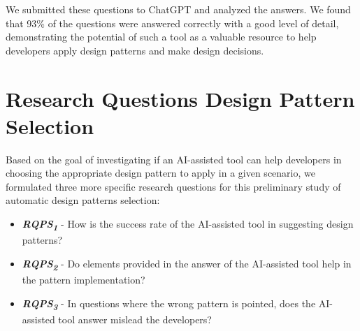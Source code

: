 We submitted these questions to ChatGPT and analyzed the answers. We found that 93\% of the questions were answered correctly with a good level of detail, demonstrating the potential of such a tool as a valuable resource to help developers apply design patterns and make design decisions.





\section{Research Questions Design Pattern Selection}\label{ResearchPreliminaryStudy}

Based on the goal of investigating if an AI-assisted tool can help developers in choosing the appropriate design pattern to apply in a given scenario, we formulated three more specific research questions for this preliminary study of automatic design patterns selection:

\begin{itemize}
    \item \textbf{\textit{RQPS\textsubscript{1}}} - How is the success rate of the AI-assisted tool in suggesting design patterns?
    \item \textbf{\textit{RQPS\textsubscript{2}}} - Do elements provided in the answer of the AI-assisted tool help in the pattern implementation?
    \item \textbf{\textit{RQPS\textsubscript{3}}} - In questions where the wrong pattern is pointed, does the AI-assisted tool answer mislead the developers?
\end{itemize}

